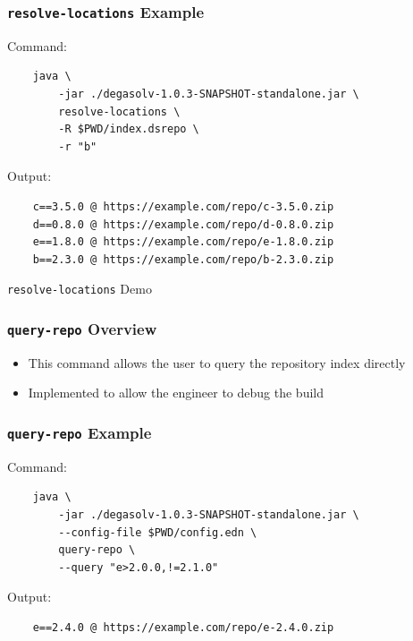 \documentclass{beamer}
\begin{document}
\begin{frame}[fragile]
  \frametitle{\texttt{resolve-locations} Example}
  Command:
\begin{verbatim}
    java \
        -jar ./degasolv-1.0.3-SNAPSHOT-standalone.jar \
        resolve-locations \
        -R $PWD/index.dsrepo \
        -r "b"
\end{verbatim}
  Output:
\begin{verbatim}
    c==3.5.0 @ https://example.com/repo/c-3.5.0.zip
    d==0.8.0 @ https://example.com/repo/d-0.8.0.zip
    e==1.8.0 @ https://example.com/repo/e-1.8.0.zip
    b==2.3.0 @ https://example.com/repo/b-2.3.0.zip
\end{verbatim}
\end{frame}
\begin{frame}
  \centerline{\color{blue}\Large \texttt{resolve-locations} Demo}
\end{frame}

\begin{frame}
  \frametitle{\texttt{query-repo} Overview}
  \begin{itemize}
  \item This command allows the user to query the repository index directly
  \item Implemented to allow the engineer to debug the build
  \end{itemize}
\end{frame}
\begin{frame}[fragile]
  \frametitle{\texttt{query-repo} Example}
  Command:
\begin{verbatim}
    java \
        -jar ./degasolv-1.0.3-SNAPSHOT-standalone.jar \
        --config-file $PWD/config.edn \
        query-repo \
        --query "e>2.0.0,!=2.1.0"
\end{verbatim}
  Output:
\begin{verbatim}
    e==2.4.0 @ https://example.com/repo/e-2.4.0.zip
\end{verbatim}
\end{frame}
\end{document}
